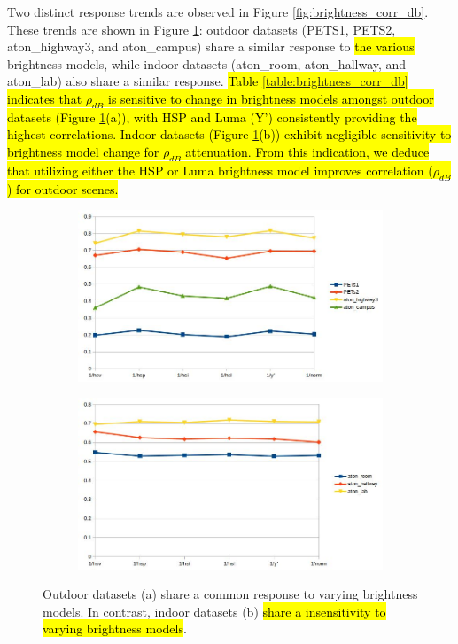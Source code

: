 \documentclass[12pt]{report}
\begin{document}
Two distinct response trends are observed in Figure \ref{fig:brightness_corr_db}. These trends are shown in Figure \ref{fig:brightness_indoor_outdoor_db}: outdoor datasets (PETS1, PETS2, aton\_highway3, and aton\_campus) share a similar response to \hl{the various} brightness models, while indoor datasets (aton\_room, aton\_hallway, and aton\_lab) also share a similar response. \hl{Table \ref{table:brightness_corr_db} indicates that $\rho_{dB}$ is sensitive to change in brightness models amongst outdoor datasets (Figure \ref{fig:brightness_indoor_outdoor_db}(a)), with HSP and Luma (Y') consistently providing the highest correlations. Indoor datasets (Figure \ref{fig:brightness_indoor_outdoor_db}(b)) exhibit negligible sensitivity to brightness model change for $\rho_{dB}$ attenuation. From this indication, we deduce that utilizing either the HSP or Luma brightness model improves correlation ($\rho_{dB}$) for outdoor scenes.}

\begin{figure}
\centering
\begin{subfigure}{.8\linewidth}
  \includegraphics[width=1\linewidth]{figures/brightness/db/correlation_outside.jpg}
  \caption{}
\end{subfigure}
\hfill
\begin{subfigure}{.8\linewidth}
  \includegraphics[width=1\linewidth]{figures/brightness/db/correlation_inside.jpg}
  \caption{}
\end{subfigure}

\caption{Outdoor datasets (a) share a common response to varying brightness models. In contrast, indoor datasets (b) \hl{share a insensitivity to varying brightness models}.}
\label{fig:brightness_indoor_outdoor_db}
\end{figure}
\end{document}
